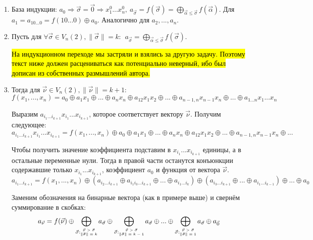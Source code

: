 \documentclass[a4paper,12pt]{article}
\newcommand{\xor}{\oplus}
\newcommand{\weight}[1]{\|#1\|}
\newcommand{\stack}[1]{\begin{matrix} #1 \end{matrix}}
\begin{document}
\begin{enumerate}
\item База индукции: $a_0 \Rightarrow \vec{\sigma} = \vec{0} \Rightarrow x_1^0 ... x_n^0, ~ a_{\vec{\sigma}} = f(\vec{\sigma}) = \bigoplus_{\vec{\alpha} \le \vec{\sigma}} f(\vec{\alpha}) $. Для $a_1 = a_{10...0} = f(10...0)\xor a_0$. Аналогично для $a_2,...,a_n$.

\item Пусть для $\forall \vec{\sigma} \in V_n(2), \weight{\vec{\sigma}} = k: ~~ a_{\vec{\sigma}} = \bigoplus_{\vec{\alpha} \le \vec{\sigma}} f(\vec{\sigma})$.

\hl{На индукционном переходе мы застряли и взялись за другую задачу. Поэтому текст ниже должен расцениваться как потенциально неверный, ибо был дописан из собственных размышлений автора.}

\item Тогда для $\vec{\nu} \in V_n(2), \weight{\vec{\nu}} = k+1$:
$$
f(x_1, ..., x_n) = a_0 \xor a_1 x_1 \xor ... \xor a_n x_n \xor a_{12} x_1 x_2 \xor ... \xor a_{n-1, n} x_{n-1} x_n \xor ... \xor a_{1...n} x_1 ... x_n
$$

Выразим $a_{i_1...i_{k+1}} x_{i_1} ... x_{i_{k+1}}$, которое соответствует вектору $\vec{\nu}$. Получим следующее:
$$
a_{i_1...i_{k+1}} x_{i_1} ... x_{i_{k+1}} =  f(x_1, ..., x_n) \xor a_0 \xor a_1 x_1 \xor ... \xor a_n x_n \xor a_{12} x_1 x_2 \xor ... \xor a_{n-1, n} x_{n-1} x_n \xor ...
$$

Чтобы получить значение коэффициента подставим в $ x_{i_1} ... x_{i_{k+1}}$ единицы, а в остальные переменные нули. Тогда в правой части останутся конъюнкции содержавшие только $ x_{i_1} ... x_{i_{k+1}}$, коэффициент $a_0$ и функция от вектора $\vec{\nu}$.
$$
a_{i_1...i_{k+1}} =  f(x_1, ..., x_n) \xor (a_{i_2 ... i_{k+1}} \xor a_{i_1 i_3 ... i_{k+1}} \xor ... \xor a_{i_1 ... i_k}) \xor (a_{i_3 ... i_{k+1}} \xor ... \xor a_{i_1 ... i_{k-1}}) \xor ... \xor a_0
$$

Заменим обозначения на бинарные вектора (как в примере выше) и свернём суммирование в скобках:
$$
a_{\vec{\nu}} = f(\vec{\nu}) \xor
\bigoplus_{\vec{\sigma}: {\tiny \stack{\vec{\nu} > \vec{\sigma} \\
        \weight{\vec{\sigma}} = k}} } a_{\vec{\sigma}} \xor
\bigoplus_{\vec{\sigma}: {\tiny \stack{\vec{\nu} > \vec{\sigma} \\
        \weight{\vec{\sigma}} = k-1}} } a_{\vec{\sigma}} \xor
...
\xor
\bigoplus_{\vec{\sigma}: {\tiny \stack{\vec{\nu} > \vec{\sigma} \\
        \weight{\vec{\sigma}} = 1}} } a_{\vec{\sigma}} \xor
a_{\vec{0}}
$$


\end{enumerate}
\end{document}
